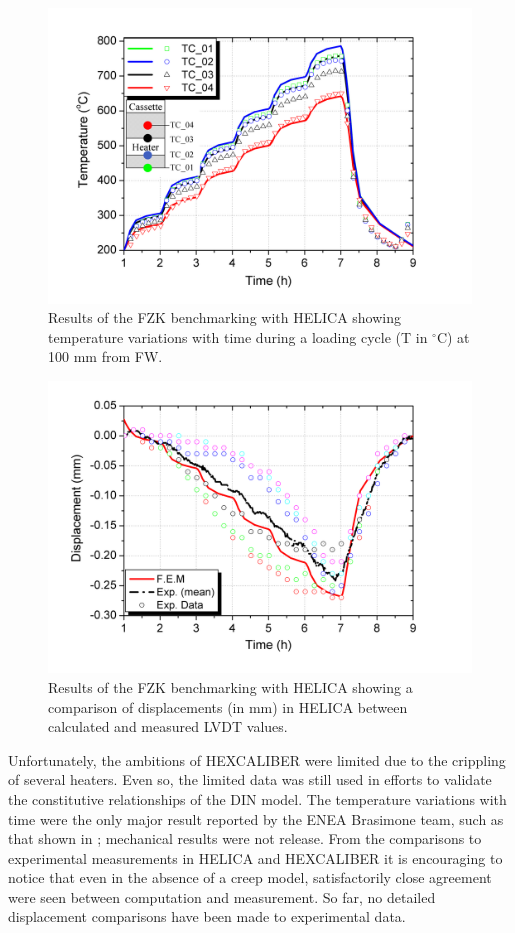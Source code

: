 \begin{figure}[t!]
\centering
\includegraphics[width=\singleimagewidth]{figures/Fig-6}
\caption{Results of the FZK benchmarking with HELICA\cite{Gan:2009vn} showing temperature variations with time during a loading cycle (T in $^\circ$C) at 100 mm from FW.}\label{fig:FZK_HELICAa}
\end{figure}

\begin{figure}[t!]
\centering
\includegraphics[width=\singleimagewidth]{figures/Fig-7}
\caption{Results of the FZK benchmarking with HELICA\cite{Gan:2009vn} showing a comparison of displacements (in mm) in HELICA between calculated and measured LVDT values.}
\label{fig:FZK_HELICAb}
\end{figure}

Unfortunately, the ambitions of HEXCALIBER were limited due to the crippling of several heaters. Even so, the limited data was still used in efforts to validate the constitutive relationships of the DIN model. The temperature variations with time were the only major result reported by the ENEA Brasimone team, such as that shown in ; mechanical results were not release. From the comparisons to experimental measurements in HELICA and HEXCALIBER it is encouraging to notice that even in the absence of a creep model, satisfactorily close agreement were seen between computation and measurement. So far, no detailed displacement comparisons have been made to experimental data.

